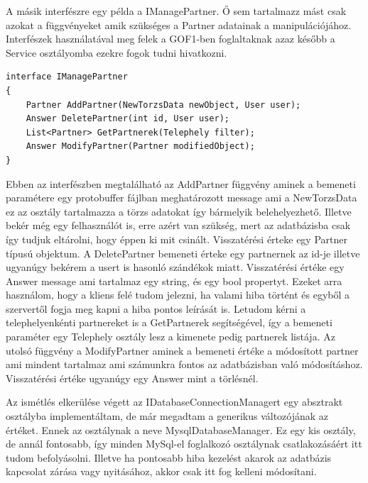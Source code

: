 \documentclass[
]{thesis-ekf}
\theoremstyle{definition}
\theoremstyle{remark}
\begin{document}
A másik interfészre egy példa a IManagePartner. Ő sem tartalmazz mást csak azokat a függvényeket amik szükséges a Partner adatainak a manipulációjához. Interfészek használatával meg felek a GOF1-ben foglaltaknak azaz később a Service osztályomba ezekre fogok tudni hivatkozni.\\
\begin{lstlisting}[caption={Kötelező interfész partnereket kezelő osztályok.},captionpos=b]
interface IManagePartner
{
	Partner AddPartner(NewTorzsData newObject, User user);
	Answer DeletePartner(int id, User user);
	List<Partner> GetPartnerek(Telephely filter);
	Answer ModifyPartner(Partner modifiedObject);
}
\end{lstlisting}
Ebben az interfészben megtalálható az AddPartner függvény aminek a bemeneti paramétere egy protobuffer fájlban meghatározott message ami a NewTorzsData ez az osztály tartalmazza a törzs adatokat így bármelyik belehelyezhető. Illetve bekér még egy felhasználót is, erre azért van szükség, mert az adatbázisba csak így tudjuk eltárolni, hogy éppen ki mit csinált. Visszatérési érteke egy Partner típusú objektum. A DeletePartner bemeneti érteke egy partnernek az id-je illetve ugyanúgy bekérem a usert is hasonló szándékok miatt. Visszatérési értéke egy Answer message ami tartalmaz egy string, és egy bool propertyt. Ezeket arra használom, hogy a kliens felé tudom jelezni, ha valami hiba történt és egyből a szervertől fogja meg kapni a hiba pontos leírását is. \cite{errorhandling}Letudom kérni a telephelyenkénti partnereket is a GetPartnerek segítségével, így a bemeneti paraméter egy Telephely osztály lesz a kimenete pedig partnerek listája. Az utolsó függvény a ModifyPartner aminek a bemeneti értéke a módosított partner ami mindent tartalmaz ami számunkra fontos az adatbázisban való módosításhoz. Visszatérési értéke ugyanúgy egy Answer mint a törlésnél.

Az ismétlés elkerülése végett az IDatabaseConnectionManagert egy absztrakt osztályba implementáltam, de már megadtam a generikus változójának az értéket. Ennek az osztálynak a neve MysqlDatabaseManager. Ez egy kis osztály, de annál fontosabb, így minden MySql-el foglalkozó osztálynak csatlakozásáért itt tudom befolyásolni. Illetve ha pontosabb hiba kezelést akarok az adatbázis kapcsolat zárása vagy nyitásához, akkor csak itt fog kelleni módosítani.
\end{document}
